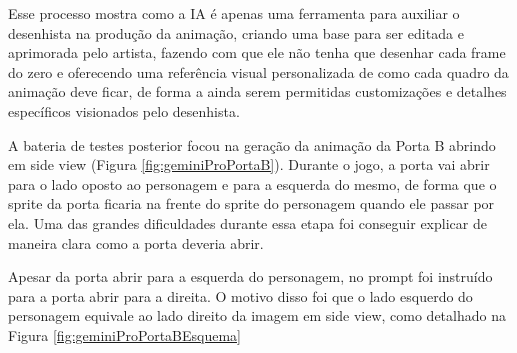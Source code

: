 Esse processo mostra como a IA é apenas uma ferramenta para auxiliar o desenhista na produção da animação, criando uma base para ser editada e aprimorada pelo artista, fazendo com que ele não tenha que desenhar cada frame do zero e oferecendo uma referência visual personalizada de como cada quadro da animação deve ficar, de forma a ainda serem permitidas customizações e detalhes específicos visionados pelo desenhista.

A bateria de testes posterior focou na geração da animação da Porta B abrindo em side view (Figura \ref{fig:geminiProPortaB}). Durante o jogo, a porta vai abrir para o lado oposto ao personagem e para a esquerda do mesmo, de forma que o sprite da porta ficaria na frente do sprite do personagem quando ele passar por ela. Uma das grandes dificuldades durante essa etapa foi conseguir explicar de maneira clara como a porta deveria abrir. 

Apesar da porta abrir para a esquerda do personagem, no prompt foi instruído para a porta abrir para a direita. O motivo disso foi que o lado esquerdo do personagem equivale ao lado direito da imagem em side view, como detalhado na Figura \ref{fig:geminiProPortaBEsquema}


